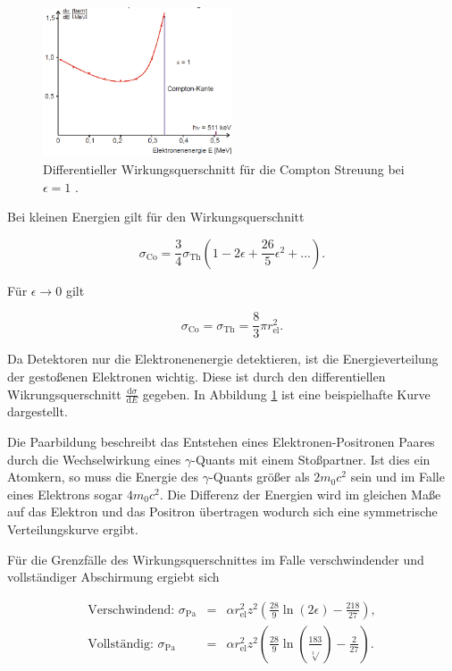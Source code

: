 \begin{figure}
	\centering
	\includegraphics[width = 0.5\textwidth]{pic/compton2.png}
	\caption{Differentieller Wirkungsquerschnitt für die Compton Streuung bei $\epsilon = 1$ \cite{anleitung}.}
	\label{compton2}
\end{figure}
Bei kleinen Energien gilt für den Wirkungsquerschnitt

\begin{equation}
	\sigma_\text{Co} = \frac{3}{4} \sigma_\text{Th} \left(1 - 2\epsilon + \frac{26}{5} \epsilon^2 + ...\right) .
\end{equation}

Für $\epsilon \rightarrow 0$ gilt

\begin{equation}
	\sigma_\text{Co} = \sigma_\text{Th} = \frac{8}{3} \pi r_\text{el}^2 .
\end{equation}

Da Detektoren nur die Elektronenenergie detektieren, ist die Energieverteilung der gestoßenen Elektronen wichtig.
Diese ist durch den differentiellen Wikrungsquerschnitt $\frac{\text{d}\sigma}{\text{d}E}$ gegeben.
In Abbildung \ref{compton2} ist eine beispielhafte Kurve dargestellt.\\
\FloatBarrier

Die Paarbildung beschreibt das Entstehen eines Elektronen-Positronen Paares durch die Wechselwirkung eines $\gamma$-Quants mit einem Stoßpartner.
Ist dies ein Atomkern, so muss die Energie des $\gamma$-Quants größer als $2 m_\text{0} c^2$ sein und im Falle eines Elektrons sogar $4 m_\text{0} c^2$.
Die Differenz der Energien wird im gleichen Maße auf das Elektron und das Positron übertragen wodurch sich eine symmetrische Verteilungskurve ergibt.

Für die Grenzfälle des Wirkungsquerschnittes im Falle verschwindender und vollständiger Abschirmung ergiebt sich

\begin{eqnarray}
	\text{Verschwindend: } \sigma_\text{Pa} &=& \alpha r_\text{el}^2 z^2 \left(\frac{28}{9} \ln(2\epsilon) - \frac{218}{27}\right) ,\\
	\text{Vollständig: } \sigma_\text{Pa} &=& \alpha r_\text{el}^2 z^2 \left(\frac{28}{9} \ln(\frac{183}{\sqrt[3]{}}) - \frac{2}{27}\right) .
\end{eqnarray}

